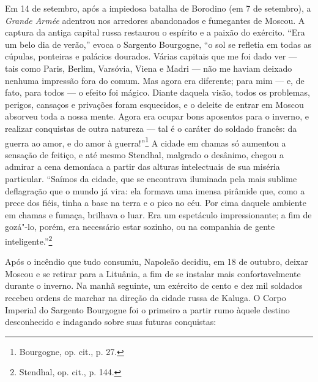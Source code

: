 \asterisc

Em 14 de setembro, após a impiedosa batalha de Borodino (em 7 de
setembro), a \emph{Grande Armée} adentrou nos arredores abandonados e
fumegantes de Moscou. A captura da antiga capital russa restaurou o
espírito e a paixão do exército. ``Era um belo dia de verão,'' evoca o
Sargento Bourgogne, ``o sol se refletia em todas as cúpulas, ponteiras e
palácios dourados. Várias capitais que me foi dado ver --- tais como
Paris, Berlim, Varsóvia, Viena e Madri --- não me haviam deixado nenhuma
impressão fora do comum. Mas agora era diferente; para mim --- e, de fato,
para todos --- o efeito foi mágico. Diante daquela visão, todos os
problemas, perigos, cansaços e privações foram esquecidos, e o deleite
de entrar em Moscou absorveu toda a nossa mente. Agora era ocupar bons
aposentos para o inverno, e realizar conquistas de outra natureza --- tal
é o caráter do soldado francês: da guerra ao amor, e do amor à
guerra!''\footnote{Bourgogne, op. cit., p. 27.} A cidade em chamas só
aumentou a sensação de feitiço, e até mesmo Stendhal, malgrado o
desânimo, chegou a admirar a cena demoníaca a partir das alturas
intelectuais de sua miséria particular. ``Saímos da cidade, que se
encontrava iluminada pela mais sublime deflagração que o mundo já vira:
ela formava uma imensa pirâmide que, como a prece dos fiéis, tinha a
base na terra e o pico no céu. Por cima daquele ambiente em chamas e
fumaça, brilhava o luar. Era um espetáculo impressionante; a fim de
gozá"-lo, porém, era necessário estar sozinho, ou na companhia de gente
inteligente.''\footnote{Stendhal, op. cit., p. 144.}

Após o incêndio que tudo consumiu, Napoleão decidiu, em 18 de outubro,
deixar Moscou e se retirar para a Lituânia, a fim de se instalar mais
confortavelmente durante o inverno. Na manhã seguinte, um exército de
cento e dez mil soldados recebeu ordens de marchar na direção da cidade
russa de Kaluga. O Corpo Imperial do Sargento Bourgogne foi o primeiro a
partir rumo àquele destino desconhecido e indagando sobre suas futuras
conquistas:

